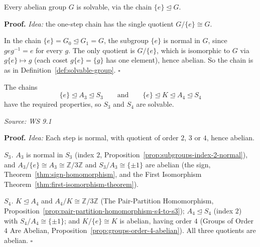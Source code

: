 \documentclass[11pt]{report}
\renewenvironment{proof}[1][Proof]{\noindent\textbf{#1.} }{\hfill$\square$\par\vspace{5pt}}
\newcommand{\srcline}[1]{\par\hfill{\footnotesize\textit{Source: #1}}}
\begin{document}
\begin{propbox}\label{prop:abelian-groups-solvable}
Every abelian group $G$ is solvable, via the chain $\{e\} \trianglelefteq G$.
\end{propbox}

\begin{proof}
\textit{Idea:} the one-step chain has the single quotient $G/\{e\} \cong G$.\par
In the chain $\{e\} = G_0 \trianglelefteq G_1 = G$, the subgroup $\{e\}$ is normal in $G$, since $g e g^{-1} = e$ for every $g$. The only quotient is $G/\{e\}$, which is isomorphic to $G$ via $g\{e\} \mapsto g$ (each coset $g\{e\} = \{g\}$ has one element), hence abelian. So the chain is as in Definition~\ref{def:solvable-group}.
\end{proof}

\begin{propbox}\label{prop:s3-s4-solvable}
The chains
\[ \{e\} \trianglelefteq A_3 \trianglelefteq S_3 \qquad\text{and}\qquad \{e\} \trianglelefteq K \trianglelefteq A_4 \trianglelefteq S_4 \]
have the required properties, so $S_3$ and $S_4$ are solvable.
\srcline{WS 9.1}
\end{propbox}

\begin{proof}
\textit{Idea:} Each step is normal, with quotient of order $2$, $3$ or $4$, hence abelian.\par
\emph{$S_3$.} $A_3$ is normal in $S_3$ (index $2$, Proposition~\ref{prop:subgroups-index-2-normal}), and $A_3/\{e\} \cong A_3 \cong \mathbb{Z}/3\mathbb{Z}$ and $S_3/A_3 \cong \{\pm 1\}$ are abelian (the sign, Theorem~\ref{thm:sign-homomorphism}, and the First Isomorphism Theorem~\ref{thm:first-isomorphism-theorem}).

\emph{$S_4$.} $K \trianglelefteq A_4$ and $A_4/K \cong \mathbb{Z}/3\mathbb{Z}$ (The Pair-Partition Homomorphism, Proposition~\ref{prop:pair-partition-homomorphism-s4-to-s3}); $A_4 \trianglelefteq S_4$ (index $2$) with $S_4/A_4 \cong \{\pm 1\}$; and $K/\{e\} \cong K$ is abelian, having order $4$ (Groups of Order $4$ Are Abelian, Proposition~\ref{prop:groups-order-4-abelian}). All three quotients are abelian.
\end{proof}
\end{document}

